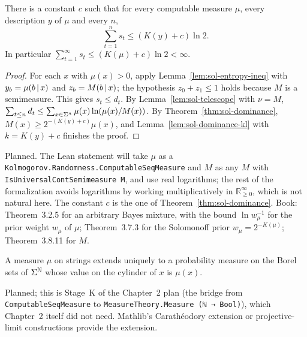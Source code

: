 \begin{theorem}[Solomonoff]\label{thm:solomonoff}
There is a constant \( c \) such that for every computable measure \( \mu \), every
description \( y \) of \( \mu \) and every \( n \),
 \[
   \sum_{t=1}^{n} s_{t} \le (K(y) + c) \ln 2 .
 \]
In particular \( \sum_{t=1}^{\infty} s_{t} \le (K(\mu) + c) \ln 2 < \infty \).
\end{theorem}
\begin{proof}
For each \( x \) with \( \mu(x) > 0 \), apply Lemma~\ref{lem:sol-entropy-ineq} with
\( y_{b} = \mu(b \,\vert\, x) \) and \( z_{b} = M(b \,\vert\, x) \); the hypothesis
\( z_{0} + z_{1} \le 1 \) holds because \( M \) is a semimeasure. This gives
\( s_{t} \le d_{t} \). By Lemma~\ref{lem:sol-telescope} with \( \nu = M \),
\( \sum_{t \le n} d_{t} \le \sum_{x \in \Sigma^{n}} \mu(x) \ln(\mu(x)/M(x)) \). By
Theorem~\ref{thm:sol-dominance}, \( M(x) \ge 2^{-(K(y)+c)}\mu(x) \), and
Lemma~\ref{lem:sol-dominance-kl} with \( k = K(y) + c \) finishes the proof.
\end{proof}

\begin{formalization}
Planned. The Lean statement will take \( \mu \) as a
\texttt{Kolmogorov.Randomness.ComputableSeqMeasure} and \( M \) as any \( M \) with
\texttt{IsUniversalContSemimeasure M}, and use real logarithms; the rest of the
formalization avoids logarithms by working multiplicatively in
\( \mathbb{R}_{\ge 0}^{\infty} \), which is not natural here. The constant \( c \) is the one
of Theorem~\ref{thm:sol-dominance}. Book: Theorem~3.2.5 for an arbitrary Bayes mixture,
with the bound \( \ln w_{\mu}^{-1} \) for the prior weight \( w_{\mu} \) of \( \mu \);
Theorem~3.7.3 for the Solomonoff prior \( w_{\mu} = 2^{-K(\mu)} \); Theorem~3.8.11 for
\( M \).
\end{formalization}

\begin{definition}\label{def:sol-seq-measure}
A measure \( \mu \) on strings extends uniquely to a probability measure on the Borel sets
of \( \Sigma^{\mathbb{N}} \) whose value on the cylinder of \( x \) is \( \mu(x) \).
\end{definition}

\begin{formalization}
Planned; this is Stage~K of the Chapter~2 plan (the bridge from
\texttt{ComputableSeqMeasure} to \texttt{MeasureTheory.Measure (ℕ → Bool)}), which
Chapter~2 itself did not need. Mathlib's Carath\'eodory extension or projective-limit
constructions provide the extension.
\end{formalization}

